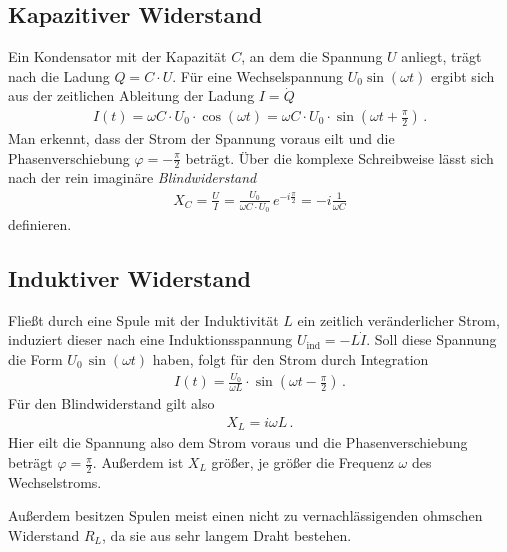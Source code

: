 \documentclass[12pt,a4paper,titlepage,headinclude,bibtotoc]{scrartcl}
\begin{document}
\subsection{Kapazitiver Widerstand}
Ein Kondensator mit der Kapazität $C$, an dem die Spannung $U$ anliegt, trägt nach \cite[S.328]{gerthsen} die Ladung $Q=C\cdot U$.
Für eine Wechselspannung $U_0\sin(\omega t)$ ergibt sich aus der zeitlichen Ableitung der Ladung $I=\dot{Q}$
\begin{align}
	I(t)=\omega C\cdot U_0\cdot \cos(\omega t)=\omega C\cdot U_0\cdot\sin\left(\omega t+\frac{\pi}{2}\right)\,.
\end{align}
Man erkennt, dass der Strom der Spannung voraus eilt und die Phasenverschiebung $\varphi=-\frac{\pi}{2}$ beträgt.
Über die komplexe Schreibweise lässt sich nach \cite[S. 1136]{tipler} der rein imaginäre \textit{Blindwiderstand}
\begin{align}
	X_C=\frac{U}{I}= \frac{U_0}{\omega C \cdot U_0}\, e^{-i\frac{\pi}{2}}=-i\frac{1}{\omega C}
\end{align}
definieren.

\subsection{Induktiver Widerstand}
Fließt durch eine Spule mit der Induktivität $L$ ein zeitlich veränderlicher Strom, induziert dieser nach \cite[S. 133]{demtroeder2} eine Induktionsspannung $U_\text{ind}=-L\dot{I}$.
Soll diese Spannung die Form $U_0\,\sin(\omega t)$ haben, folgt für den Strom durch Integration
\begin{align}
	I(t)=\frac{U_0}{\omega L}\cdot \sin\left(\omega t-\frac{\pi}{2}\right)\,.
\end{align}
Für den Blindwiderstand gilt also
\begin{align}
	X_L=i\omega L \,.
\end{align}
Hier eilt die Spannung also dem Strom voraus und die Phasenverschiebung beträgt $\varphi=\frac{\pi}{2}$.
Außerdem ist $X_L$ größer, je größer die Frequenz $\omega$ des Wechselstroms.

Außerdem besitzen Spulen meist einen nicht zu vernachlässigenden ohmschen Widerstand $R_L$, da sie aus sehr langem Draht bestehen.
\end{document}
